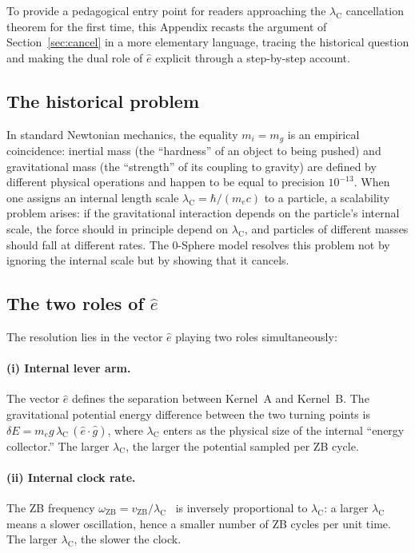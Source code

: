 \documentclass[%
 reprint, amsmath,amssymb, aps, prb, ]{revtex4-2}
\numberwithin{equation}{section}
\newcommand{\omZB}{\omega_{\text{ZB}}}
\newcommand{\lambdaC}{\lambda_{\mathrm{C}}}
\newcommand{\vZB}{v_{\mathrm{ZB}}}
\begin{document}
To provide a pedagogical entry point for readers approaching the $\lambdaC$ cancellation theorem for the first time, this Appendix recasts the argument of Section~\ref{sec:cancel} in a more elementary language, tracing the historical question and making the dual role of $\hat{e}$ explicit through a step-by-step account.

\subsection{The historical problem}

In standard Newtonian mechanics, the equality $m_i = m_g$ is an empirical coincidence: inertial mass (the ``hardness'' of an object to being pushed) and gravitational mass (the ``strength'' of its coupling to gravity) are defined by different physical operations and happen to be equal to precision $10^{-13}$. When one assigns an internal length scale $\lambdaC = \hbar/(m_e c)$ to a particle, a scalability problem arises: if the gravitational interaction depends on the particle's internal scale, the force should in principle depend on $\lambdaC$, and particles of different masses should fall at different rates. The 0-Sphere model resolves this problem not by ignoring the internal scale but by showing that it cancels.

\subsection{The two roles of $\hat{e}$}

The resolution lies in the vector $\hat{e}$ playing two roles simultaneously:

\paragraph{(i) Internal lever arm.} The vector $\hat{e}$ defines the separation between Kernel~A and Kernel~B. The gravitational potential energy difference between the two turning points is $\delta E = m_e g\,\lambdaC\,(\hat{e}\cdot\hat{g})$, where $\lambdaC$ enters as the physical size of the internal ``energy collector.'' The larger $\lambdaC$, the larger the potential sampled per ZB cycle.

\paragraph{(ii) Internal clock rate.} The ZB frequency $\omZB = \vZB/\lambdaC$~\cite{hanamura33} is inversely proportional to $\lambdaC$: a larger $\lambdaC$ means a slower oscillation, hence a smaller number of ZB cycles per unit time. The larger $\lambdaC$, the slower the clock.
\end{document}
